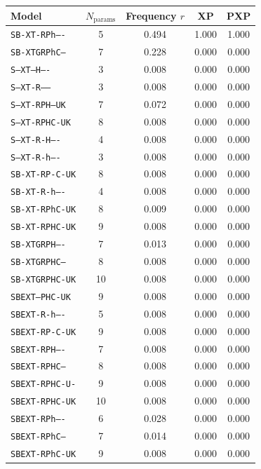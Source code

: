 \begin{tabular}{lcccc}
\toprule
Model & $N_{\text{params}}$ & Frequency $r$ & XP & PXP \\
\midrule
\texttt{SB-XT-RPh----} & 5 & 0.494 & 1.000 & 1.000 \\
\texttt{SB-XTGRPhC---} & 7 & 0.228 & 0.000 & 0.000 \\
\texttt{S--XT---H----} & 3 & 0.008 & 0.000 & 0.000 \\
\texttt{S--XT-R------} & 3 & 0.008 & 0.000 & 0.000 \\
\texttt{S--XT-RPH--UK} & 7 & 0.072 & 0.000 & 0.000 \\
\texttt{S--XT-RPHC-UK} & 8 & 0.008 & 0.000 & 0.000 \\
\texttt{S--XT-R-H----} & 4 & 0.008 & 0.000 & 0.000 \\
\texttt{S--XT-R-h----} & 3 & 0.008 & 0.000 & 0.000 \\
\texttt{SB-XT-RP-C-UK} & 8 & 0.008 & 0.000 & 0.000 \\
\texttt{SB-XT-R-h----} & 4 & 0.008 & 0.000 & 0.000 \\
\texttt{SB-XT-RPhC-UK} & 8 & 0.009 & 0.000 & 0.000 \\
\texttt{SB-XT-RPHC-UK} & 9 & 0.008 & 0.000 & 0.000 \\
\texttt{SB-XTGRPH----} & 7 & 0.013 & 0.000 & 0.000 \\
\texttt{SB-XTGRPHC---} & 8 & 0.008 & 0.000 & 0.000 \\
\texttt{SB-XTGRPHC-UK} & 10 & 0.008 & 0.000 & 0.000 \\
\texttt{SBEXT--PHC-UK} & 9 & 0.008 & 0.000 & 0.000 \\
\texttt{SBEXT-R-h----} & 5 & 0.008 & 0.000 & 0.000 \\
\texttt{SBEXT-RP-C-UK} & 9 & 0.008 & 0.000 & 0.000 \\
\texttt{SBEXT-RPH----} & 7 & 0.008 & 0.000 & 0.000 \\
\texttt{SBEXT-RPHC---} & 8 & 0.008 & 0.000 & 0.000 \\
\texttt{SBEXT-RPHC-U-} & 9 & 0.008 & 0.000 & 0.000 \\
\texttt{SBEXT-RPHC-UK} & 10 & 0.008 & 0.000 & 0.000 \\
\texttt{SBEXT-RPh----} & 6 & 0.028 & 0.000 & 0.000 \\
\texttt{SBEXT-RPhC---} & 7 & 0.014 & 0.000 & 0.000 \\
\texttt{SBEXT-RPhC-UK} & 9 & 0.008 & 0.000 & 0.000 \\
\bottomrule
\end{tabular}
